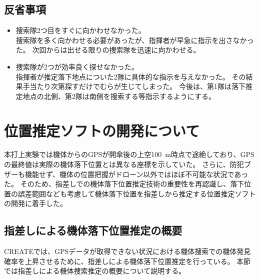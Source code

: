 \documentclass[a4paper,11pt,titlepage,uplatex]{jsarticle}
\begin{document}
\subsection{反省事項}
\begin{itemize}
    \item 捜索隊2つ目をすぐに向かわせなかった。\\
    捜索隊を多く向かわせる必要があったが、指揮者が早急に指示を出さなかった。
    次回からは出せる限りの捜索隊を迅速に向かわせる。
    \item 捜索隊が2つが効率良く探せなかった。\\
    指揮者が推定落下地点についた2隊に具体的な指示を与えなかった。
    その結果手当たり次第探すだけでむらが生じてしまった。
    今後は、第1隊は落下推定地点の北側、第2隊は南側を捜索する等指示するようにする。
\end{itemize}

\section{位置推定ソフトの開発について}
本打上実験では機体からのGPSが開傘後の上空\SI{100}{m}時点で途絶しており、GPSの最終値は実際の機体落下位置とは異なる座標を示していた。
さらに、防犯ブザーも機能せず、機体の位置把握がドローン以外ではほぼ不可能な状況であった。
そのため、指差しでの機体落下位置推定技術の重要性を再認識し、落下位置の誤差範囲なども考慮して機体落下位置を指差しから推定する位置推定ソフトの開発に着手した。

\subsection{指差しによる機体落下位置推定の概要}
CREATEでは、GPSデータが取得できない状況における機体捜索での機体発見確率を上昇させるために、指差しによる機体落下位置推定を行っている。
本節では指差しによる機体捜索推定の概要について説明する。
\end{document}
